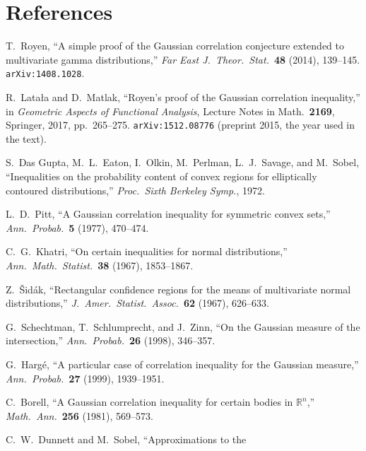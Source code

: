 \documentclass[12pt,a4paper]{article}
\theoremstyle{definition}
\newcommand{\R}{\mathbb{R}}
\begin{document}
\section*{References}

\begin{enumerate}[nosep,label={[\arabic*]}]
  \item T.\ Royen, ``A simple proof of the Gaussian correlation
    conjecture extended to multivariate gamma distributions,''
    \textit{Far East J.\ Theor.\ Stat.}\ \textbf{48} (2014), 139--145.
    \texttt{arXiv:1408.1028}.
  \item R.\ Lata{\l}a and D.\ Matlak, ``Royen's proof of the Gaussian
    correlation inequality,'' in \textit{Geometric Aspects of Functional
    Analysis}, Lecture Notes in Math.\ \textbf{2169}, Springer, 2017,
    pp.\ 265--275.  \texttt{arXiv:1512.08776} (preprint 2015, the year
    used in the text).
  \item S.\ Das Gupta, M.\ L.\ Eaton, I.\ Olkin, M.\ Perlman,
    L.\ J.\ Savage, and M.\ Sobel, ``Inequalities on the probability
    content of convex regions for elliptically contoured
    distributions,'' \textit{Proc.\ Sixth Berkeley Symp.}, 1972.
  \item L.\ D.\ Pitt, ``A Gaussian correlation inequality for symmetric
    convex sets,'' \textit{Ann.\ Probab.}\ \textbf{5} (1977), 470--474.
  \item C.\ G.\ Khatri, ``On certain inequalities for normal
    distributions,'' \textit{Ann.\ Math.\ Statist.}\ \textbf{38}
    (1967), 1853--1867.
  \item Z.\ \v{S}id\'ak, ``Rectangular confidence regions for the means
    of multivariate normal distributions,'' \textit{J.\ Amer.\ Statist.\
    Assoc.}\ \textbf{62} (1967), 626--633.
  \item G.\ Schechtman, T.\ Schlumprecht, and J.\ Zinn, ``On the
    Gaussian measure of the intersection,'' \textit{Ann.\ Probab.}\
    \textbf{26} (1998), 346--357.
  \item G.\ Harg\'e, ``A particular case of correlation inequality for
    the Gaussian measure,'' \textit{Ann.\ Probab.}\ \textbf{27} (1999),
    1939--1951.
  \item C.\ Borell, ``A Gaussian correlation inequality for certain
    bodies in $\R^n$,'' \textit{Math.\ Ann.}\ \textbf{256} (1981),
    569--573.
  \item C.\ W.\ Dunnett and M.\ Sobel, ``Approximations to the

\end{enumerate}
\end{document}
